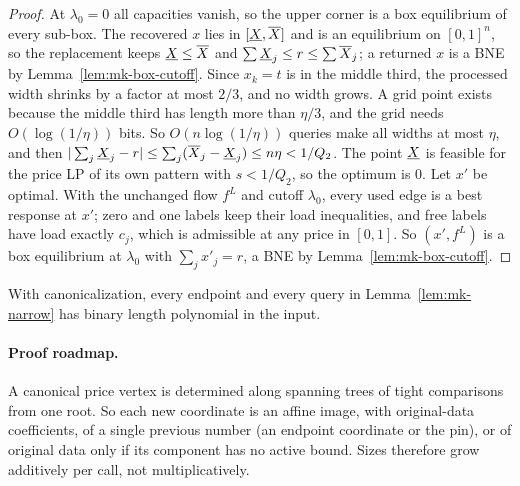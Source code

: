 \begin{proof}
At $\lambda_0=0$ all capacities vanish, so the upper corner is a box equilibrium of every sub-box. The
recovered $x$ lies in $[\underline{X}{},\overline{X}{}]$ and is an equilibrium on $[0,1]^n$, so the replacement keeps $\underline{X}{}\le \overline{X}{}$ and
$\sum \underline{X}_j\le r\le\sum \overline{X}_j$; a returned $x$ is a BNE by Lemma~\ref{lem:mk-box-cutoff}. Since $x_k=t$ is
in the middle third, the processed width shrinks by a factor at most $2/3$, and no width grows. A grid
point exists because the middle third has length more than $\eta/3$, and the grid needs
$O(\log(1/\eta))$ bits. So $O(n\log(1/\eta))$ queries make all widths at most $\eta$, and then
$|\sum_j\underline{X}_j-r|\le\sum_j(\overline{X}_j-\underline{X}_j)\le n\eta<1/Q_2$. The point $\underline{X}{}$ is feasible for the price LP of its own
pattern with $s<1/Q_2$, so the optimum is $0$. Let $x'$ be optimal. With the unchanged flow $f^L$ and
cutoff $\lambda_0$, every used edge is a best response at $x'$; zero and one labels keep their load
inequalities, and free labels have load exactly $c_j$, which is admissible at any price in $[0,1]$. So
$(x',f^L)$ is a box equilibrium at $\lambda_0$ with $\sum_jx'_j=r$, a BNE by
Lemma~\ref{lem:mk-box-cutoff}.
\end{proof}

\begin{lemma}\label{lem:mk-bits}
With canonicalization, every endpoint and every query in Lemma~\ref{lem:mk-narrow} has binary length
polynomial in the input.
\end{lemma}

\paragraph{Proof roadmap.} A canonical price vertex is determined along spanning trees of tight comparisons
from one root. So each new coordinate is an affine image, with original-data coefficients, of a single
previous number (an endpoint coordinate or the pin), or of original data only if its component has no
active bound. Sizes therefore grow additively per call, not
multiplicatively.

